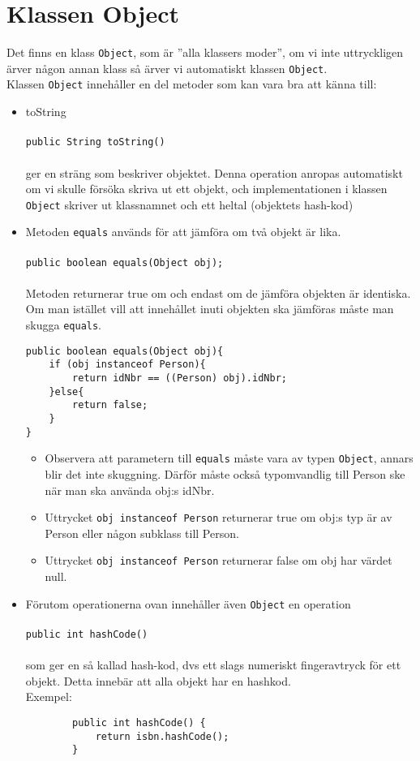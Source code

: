 \documentclass[11pt]{article}
\begin{document}
\section{Klassen Object}
Det finns en klass \verb+Object+, som är ''alla klassers moder'', om vi inte uttryckligen ärver någon annan klass så ärver vi automatiskt klassen \verb+Object+. \\
Klassen \verb+Object+ innehåller en del metoder som kan vara bra att känna till:
\begin{itemize}
\item{toString \\ \\
	\verb+public String toString()+ \\ \\
	ger en sträng som beskriver objektet. Denna operation anropas automatiskt om vi skulle försöka skriva ut ett objekt, och implementationen i klassen \verb+Object+ skriver ut klassnamnet och ett heltal (objektets hash-kod)}

\item{Metoden \verb+equals+ används för att jämföra om två objekt är lika. \\ \\
	\verb+public boolean equals(Object obj);+ \\ \\
	Metoden returnerar true om och endast om de jämföra objekten är identiska. Om man istället vill att innehållet inuti objekten ska jämföras måste man skugga \verb+equals+.
	\begin{lstlisting}
public boolean equals(Object obj){
	if (obj instanceof Person){
		return idNbr == ((Person) obj).idNbr;
	}else{
		return false;
	}
}
	\end{lstlisting}
	\begin{itemize}
	\item{Observera att parametern till \verb+equals+ måste vara av typen \verb+Object+, annars blir det inte skuggning. Därför måste också typomvandlig till Person ske när man ska använda obj:s idNbr. }
	\item{Uttrycket \verb+obj instanceof Person+ returnerar true om obj:s typ är av Person eller någon subklass till Person.}
	\item{Uttrycket \verb+obj instanceof Person+ returnerar false om obj har värdet null.}
	\end{itemize}
	}

\item{Förutom operationerna ovan innehåller även \verb+Object+ en operation \\ \\
	\verb+public int hashCode()+ \\ \\
		som ger en så kallad hash-kod, dvs ett slags numeriskt fingeravtryck för ett objekt. Detta innebär att alla objekt har en hashkod. \\
		Exempel: \\
		\begin{lstlisting}
		public int hashCode() {
			return isbn.hashCode();
		}
		\end{lstlisting}
		}
	
\end{itemize}
\end{document}
